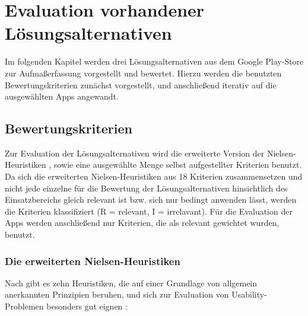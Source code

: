 \chapter{Evaluation vorhandener Lösungsalternativen}
Im folgenden Kapitel werden drei Lösungsalternativen aus dem Google Play-Store zur Aufmaßerfassung vorgestellt und bewertet. Hierzu werden die benutzten Bewertungskriterien zunächst vorgestellt, und anschließend iterativ auf die ausgewählten Apps angewandt.

\section{Bewertungskriterien}
Zur Evaluation der Lösungsalternativen wird die erweiterte Version der Nielsen-Heuristiken \citep{Nielsen94}, sowie eine ausgewählte Menge selbst aufgestellter Kriterien benutzt.
Da sich die erweiterten Nielsen-Heuristiken aus 18 Kriterien zusammensetzen und nicht jede einzelne für die Bewertung der Lösungsalternativen hinsichtlich des Einsatzbereichs gleich relevant ist bzw. sich nur bedingt anwenden lässt, werden die Kriterien klassifiziert (R = relevant, I = irrelavant).
Für die Evaluation der Apps werden anschließend nur Kriterien, die als relevant gewichtet wurden, benutzt.

\subsection{Die erweiterten Nielsen-Heuristiken}\label{subsec:nielsen}
Nach \citeauthor{Nielsen94} gibt es zehn Heuristiken, die auf einer Grundlage von allgemein anerkannten Prinzipien beruhen, und sich zur Evaluation von Usability-Problemen besonders gut eignen \citep[Seiten 25--62]{Nielsen94}: 

\begin{enumerate}
\end{enumerate} 

